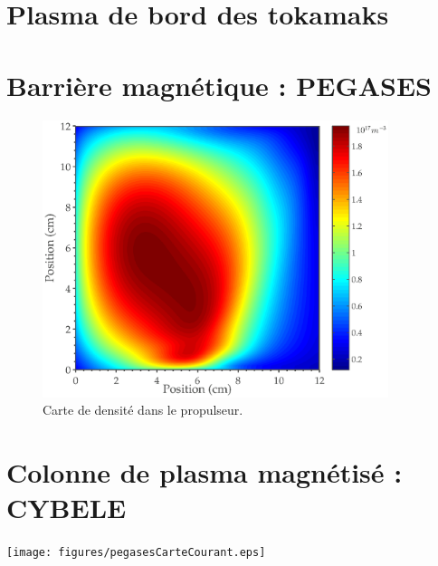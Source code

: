 \begin{refsection}

	\section{Plasma de bord des tokamaks}
		 
	\section{Barrière magnétique : PEGASES}
		\begin{figure}[htbp]
\centering
\includegraphics[height=0.7\textwidth,width=0.9\textwidth]{figures/pegasescarteDensite.eps}{\caption{Carte
de densité dans le propulseur.
}\label{4-pegasesDensite}}
\end{figure}
	\section{Colonne de plasma magnétisé : CYBELE}
	\texttt{[image: figures/pegasesCarteCourant.eps]}

		
	
%
%
\end{refsection}
